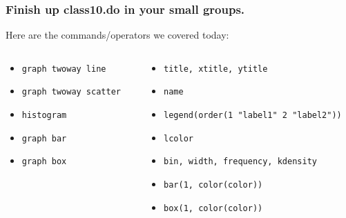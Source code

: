\documentclass[11pt]{beamer}
\begin{document}
\begin{frame}
\frametitle{Finish up class10.do in your small groups.}
Here are the commands/operators we covered today:
\begin{columns}
	\begin{column}{0.5\textwidth}
		\begin{itemize}
			\item \texttt{graph twoway line}
			\item \texttt{graph twoway scatter}
			\item \texttt{histogram}
			\item \texttt{graph bar}
			\item \texttt{graph box}
		\end{itemize}
	\end{column}
	\begin{column}{0.5\textwidth}
		\begin{itemize}
			\item \texttt{title, xtitle, ytitle}
			\item \texttt{name}
			\item \texttt{legend(order(1 "label1" 2 "label2"))}
			\item \texttt{lcolor}
			\item \texttt{bin, width, frequency, kdensity}	
			\item \texttt{bar(1, color(color))}	
			\item \texttt{box(1, color(color))}	
		\end{itemize}
	\end{column}
\end{columns}
\end{frame}
\end{document}
